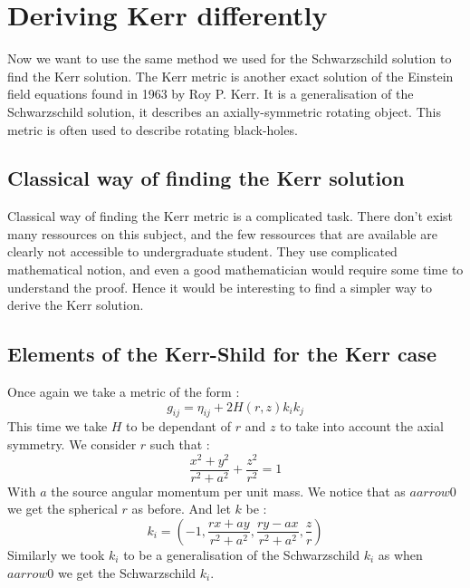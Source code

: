 \documentclass[a4paper,12pt]{article}
\theoremstyle{definition}
\begin{document}
\section{Deriving Kerr differently}
Now we want to use the same method we used for the Schwarzschild solution to find the Kerr solution.
The Kerr metric is another exact solution of the Einstein field equations found in 1963 by Roy P. Kerr.
It is a generalisation of the Schwarzschild solution, it describes an axially-symmetric rotating object.
This metric is often used to describe rotating black-holes.\\
\subsection{Classical way of finding the Kerr solution}
Classical way of finding the Kerr metric is a complicated task.
There don't exist many ressources on this subject, and the few ressources that are available are clearly not accessible to undergraduate student.
They use complicated mathematical notion, and even a good mathematician would require some time to understand the proof.
Hence it would be interesting to find a simpler way to derive the Kerr solution.
\subsection{Elements of the Kerr-Shild for the Kerr case}
Once again we take a metric of the form :
\begin{equation}
	g_{ij}=\eta_{ij}+2H(r,z)k_ik_j
\end{equation}
This time we take $H$ to be dependant of $r$ and $z$ to take into account the axial symmetry.
We consider $r$ such that :
\begin{equation}
	\frac{x^2+y^2}{r^2+a^2}+\frac{z^2}{r^2}=1
\end{equation}
With $a$ the source angular momentum per unit mass.
We notice that as $a arrow 0$ we get the spherical $r$ as before.
And let $k$ be :
\begin{equation}
	k_i=(-1,\frac{r x + a y}{r^2 + a^2},\frac{ry-ax}{r^2+a^2},\frac{z}{r})
\end{equation}
Similarly we took $k_i$ to be a generalisation of the Schwarzschild $k_i$ as when $a arrow 0$ we get the Schwarzschild $k_i$.
\end{document}
